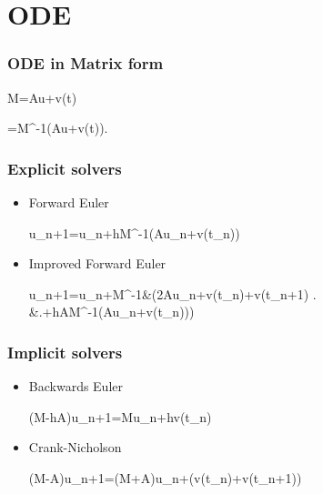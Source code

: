 \section{ODE }

\begin{frame}
\frametitle{ODE in Matrix form}
	\begin{block}{}
		\begin{flalign*}
			M=Au+v(t)
		\end{flalign*}
	\end{block}
	\begin{block}{}
		\begin{flalign*}
			=M^{-1}(Au+v(t)).
		\end{flalign*}
	\end{block}
\end{frame}

\begin{frame}
\frametitle{Explicit solvers}
	\begin{block}{}
		\begin{itemize}
			\item Forward Euler
			\begin{flalign*}
				u_{n+1}=u_n+hM^{-1}(Au_n+v(t_n))
			\end{flalign*}
			\item Improved Forward Euler
			\begin{flalign*}
				u_{n+1}=u_n+M^{-1}&\left(2Au_n+v(t_n)+v(t_{n+1}) \right. \\
					&\left.+hA\cdot M^{-1}\left(Au_n+v(t_n)\right)\right)
			\end{flalign*}
		\end{itemize}
	\end{block}
\end{frame}

\begin{frame}
\frametitle{Implicit solvers}
	\begin{block}{}
		\begin{itemize}
			\item Backwards Euler
			\begin{flalign*}
				(M-hA)u_{n+1}=Mu_n+hv(t_n)
			\end{flalign*}
			\item Crank-Nicholson
			\begin{flalign*}
				(M-A)u_{n+1}=(M+\frac{h}{2}A)u_n+(v(t_n)+v(t_{n+1}))
			\end{flalign*}
		\end{itemize}
	\end{block}
\end{frame}
